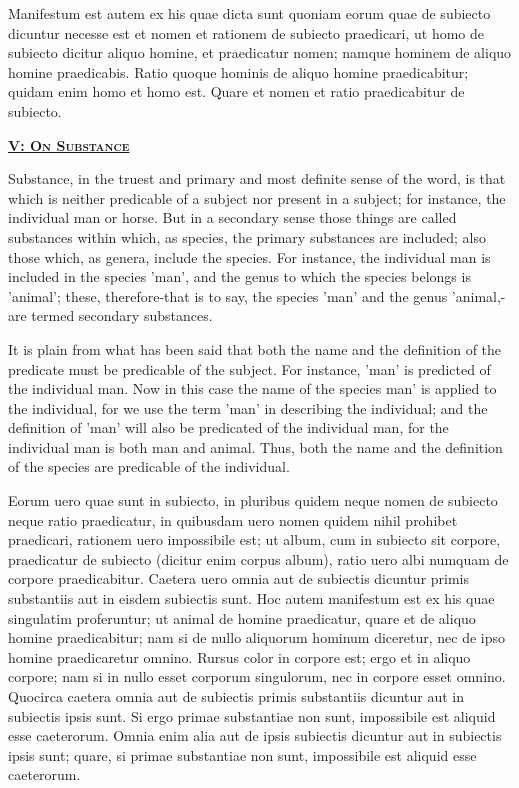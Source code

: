\documentclass[14pt,twoside]{extbook}
\newcommand{\mktitle}[1]{%
    {\begin{center}\small\textsc{\bfseries\underline{#1}}\end{center}}}
\begin{document}
Manifestum est autem ex his quae
dicta sunt quoniam eorum quae de subiecto dicuntur necesse est et
nomen et rationem de subiecto praedicari, ut homo de subiecto dicitur
aliquo homine, et praedicatur nomen; namque hominem de aliquo homine
praedicabis. Ratio quoque hominis de aliquo homine praedicabitur;
quidam enim homo et homo est. Quare et nomen et ratio praedicabitur de
subiecto.\newpage

\mktitle{V: On Substance}

Substance, in the truest and primary and most definite sense of the word, is that which is neither predicable of a subject nor present in a subject; for instance, the individual man or horse. But in a secondary sense those things are called substances within which, as species, the primary substances are included; also those which, as genera, include the species. For instance, the individual man is included in the species 'man', and the genus to which the species belongs is 'animal'; these, therefore-that is to say, the species 'man' and the genus 'animal,-are termed secondary substances.

It is plain from what has been said that both the name and the definition of the predicate must be predicable of the subject. For instance, 'man' is predicted of the individual man. Now in this case the name of the species man' is applied to the individual, for we use the term 'man' in describing the individual; and the definition of 'man' will also be predicated of the individual man, for the individual man is both man and animal. Thus, both the name and the definition of the species are predicable of the individual.\newpage

Eorum uero quae sunt in subiecto, in pluribus quidem neque
nomen de subiecto neque ratio praedicatur, in quibusdam uero nomen
quidem nihil prohibet praedicari, rationem uero impossibile est; ut
album, cum in subiecto sit corpore, praedicatur de subiecto (dicitur
enim corpus album), ratio uero albi numquam de corpore
praedicabitur. Caetera uero omnia aut de subiectis dicuntur primis
substantiis aut in eisdem subiectis sunt. Hoc autem manifestum est ex
his quae singulatim proferuntur; ut animal de homine praedicatur,
quare et de aliquo homine praedicabitur; nam si de nullo aliquorum
hominum diceretur, nec de ipso homine praedicaretur omnino. Rursus
color in corpore est; ergo et in aliquo corpore; nam si in nullo esset
corporum singulorum, nec in corpore esset omnino. Quocirca caetera
omnia aut de subiectis primis substantiis dicuntur aut in subiectis
ipsis sunt. Si ergo primae substantiae non sunt, impossibile est
aliquid esse caeterorum. Omnia enim alia aut de ipsis subiectis
dicuntur aut in subiectis ipsis sunt; quare, si primae substantiae non
sunt, impossibile est aliquid esse caeterorum.
\end{document}

